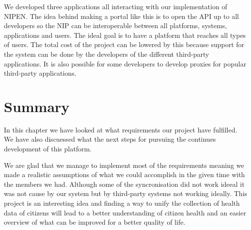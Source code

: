 We developed three applications all interacting with our implementation of NIPEN. 
The idea behind making a portal like this is to open the API up to all developers so the NIP can be interoperable between all platforms, systems, applications and users. 
The ideal goal is to have a platform that reaches all types of users. 
The total cost of the project can be lowered by this because support for the system can be done by the developers of the different third-party applications. 
It is also possible for some developers to develop proxies for popular third-party applications.


\section{Summary}
In this chapter we have looked at what requirements our project have fulfilled. 
We have also discuessed what the next steps for pursuing the continues development of this platform. 

We are glad that we manage to implement most of the requirements meaning we made a realistic assumptions of what we could accomplish in the given time with the members we had. 
Although some of the syncronisation did not work ideeal it was not cause by our system but by third-party systems not working ideally. 
This project is an interesting idea and finding a way to unify the collection of health data of citizens will lead to a better understanding of citizen health and an easier overview of what can be improved for a better quality of life. 
